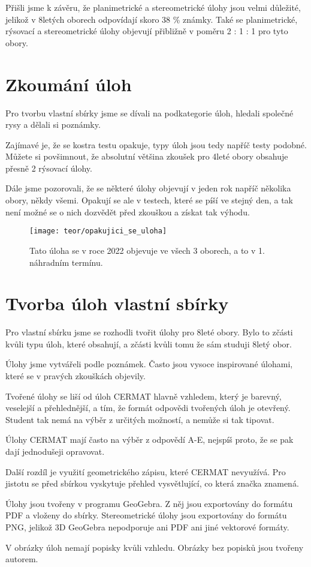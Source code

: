 Přišli jsme k závěru, že planimetrické a stereometrické úlohy jsou velmi důležité, jelikož v 8letých oborech odpovídají skoro 38 \% známky. Také se planimetrické, rýsovací a stereometrické úlohy objevují přibližně v poměru 2 : 1 : 1 pro tyto obory.




\section{Zkoumání úloh}

Pro tvorbu vlastní sbírky jsme se dívali na podkategorie úloh, hledali společné rysy a dělali si poznámky.

Zajímavé je, že se kostra testu opakuje, typy úloh jsou tedy napříč testy podobné. Můžete si povšimnout, že absolutní většina zkoušek pro 4leté obory obsahuje přesně 2 rýsovací úlohy.

Dále jsme pozorovali, že se některé úlohy objevují v jeden rok napříč několika obory, někdy všemi. Opakují se ale v testech, které se píší ve stejný den, a tak není možné se o nich dozvědět před zkouškou a získat tak výhodu.


\begin{figure}[h]
    \caption{Tato úloha se v roce 2022 objevuje ve všech 3 oborech, a to v 1. náhradním termínu.~\cite{CERMAT_pdfka}}
    \centering
    \texttt{[image: teor/opakujici\_se\_uloha]}
\end{figure}


\section{Tvorba úloh vlastní sbírky}

Pro vlastní sbírku jsme se rozhodli tvořit úlohy pro 8leté obory. Bylo to zčásti kvůli typu úloh, které obsahují, a zčásti kvůli tomu že sám studuji 8letý obor.

Úlohy jsme vytvářeli podle poznámek. Často jsou vysoce inspirované úlohami, které se v pravých zkouškách objevily.

Tvořené úlohy se liší od úloh CERMAT hlavně vzhledem, který je barevný, veselejší a přehlednější, a tím, že formát odpovědi tvořených úloh je otevřený. Student tak nemá na výběr z určitých možností, a nemůže si tak tipovat.

Úlohy CERMAT mají často na výběr z odpovědí A-E, nejspíš proto, že se pak dají jednodušeji opravovat.

Další rozdíl je využití geometrického zápisu, které CERMAT nevyužívá. Pro jistotu se před sbírkou vyskytuje přehled vysvětlující, co která značka znamená.

Úlohy jsou tvořeny v programu GeoGebra. Z něj jsou exportovány do formátu PDF a vloženy do sbírky. Stereometrické úlohy jsou exportovány do formátu PNG, jelikož 3D GeoGebra nepodporuje ani PDF ani jiné vektorové formáty.

V obrázky úloh nemají popisky kvůli vzhledu. Obrázky bez popisků jsou tvořeny autorem.
